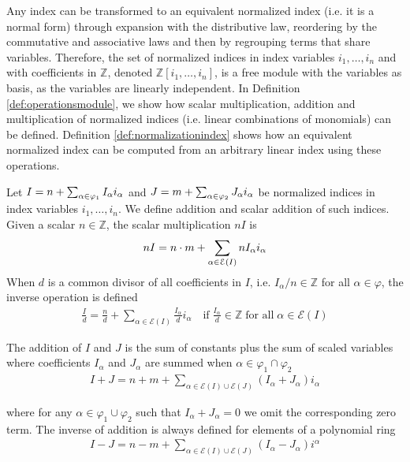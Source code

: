 Any index can be transformed to an equivalent normalized index (i.e. it is a normal form) through expansion with the distributive law, reordering by the commutative and associative laws and then by regrouping terms that share variables. Therefore, the set of normalized indices in index variables $i_1,\dots,i_n$ and with coefficients in $\mathbb{Z}$, denoted $\mathbb{Z}[i_1,\dots,i_n]$, is a free module with the variables as basis, as the variables are linearly independent. In Definition \ref{def:operationsmodule}, we show how scalar multiplication, addition and multiplication of normalized indices (i.e. linear combinations of monomials) can be defined. Definition \ref{def:normalizationindex} shows how an equivalent normalized index can be computed from an arbitrary linear index using these operations.
%
\begin{definition}\label{def:operationsmodule}
Let $I = \normlinearindex[\varphi_1]{n}{I}$ and $J = \normlinearindex[\varphi_2]{m}{J}$ be normalized indices in index variables $i_1,\dots,i_n$. We define addition and scalar addition of such indices. Given a scalar $n\in\mathbb{Z}$, the scalar multiplication $n I$ is
%
\begin{align*}
    n I = \normlinearindex[\mathcal{E}(I)]{n \cdot m}{n I}
\end{align*}
When $d$ is a common divisor of all coefficients in $I$, i.e. $I_\alpha / n \in \mathbb{Z}$ for all $\alpha\in\varphi$, the inverse operation is defined
\begin{align*}
    \frac{I}{d} = \frac{n}{d} + \sum_{\alpha\in \mathcal{E}(I)} \frac{I_\alpha}{d} i_\alpha\quad\text{if}\;\frac{I_\alpha}{d} \in \mathbb{Z}\;\text{for all}\;\alpha\in\mathcal{E}(I)
\end{align*}

The addition of $I$ and $J$ is the sum of constants plus the sum of scaled variables where coefficients $I_\alpha$ and $J_\alpha$ are summed when $\alpha\in\varphi_1 \cap \varphi_2$
\begin{align*}
    I + J = n + m + \sum_{\alpha \in \mathcal{E}(I) \cup \mathcal{E}(J)}(I_\alpha + J_\alpha)i_\alpha
\end{align*}

where for any $\alpha\in \varphi_1 \cup \varphi_2$ such that $I_\alpha + J_\alpha = 0$ we omit the corresponding zero term. The inverse of addition is always defined for elements of a polynomial ring
%
\begin{align*}
    I - J = n - m + \sum_{\alpha \in \mathcal{E}(I) \cup \mathcal{E}(J)}(I_\alpha - J_\alpha)i^\alpha
\end{align*}
\end{definition}
